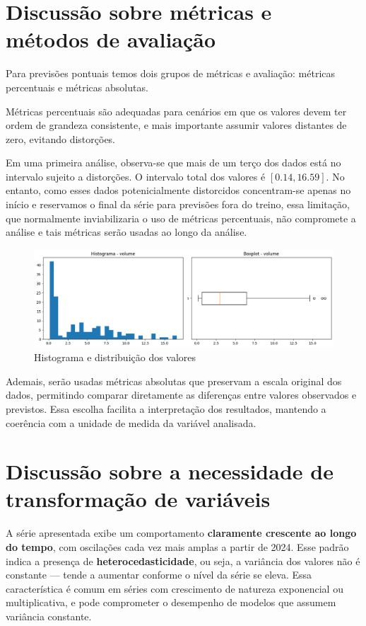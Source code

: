 \documentclass{article}
\begin{document}
\section*{Discussão sobre métricas e métodos de avaliação}

Para previsões pontuais temos dois grupos de métricas e avaliação: métricas percentuais e métricas absolutas.

Métricas percentuais são adequadas para cenários em que os valores devem ter ordem de grandeza consistente, e mais importante assumir valores distantes de zero, evitando distorções. 

Em uma primeira análise, observa-se que mais de um terço dos dados está no intervalo sujeito a distorções. O intervalo total dos valores é $[0.14, 16.59]$. No entanto, como esses dados potenicialmente distorcidos concentram-se apenas no início e reservamos o final da série para previsões fora do treino, essa limitação, que normalmente inviabilizaria o uso de métricas percentuais, não compromete a análise e tais métricas serão usadas ao longo da análise.


\begin{figure}[h]
    \centering
    \includegraphics[width=0.75\linewidth]{images/histogram.png}
    \caption{Histograma e distribuição dos valores}
\end{figure}

Ademais, serão usadas métricas absolutas que preservam a escala original dos dados, permitindo comparar diretamente as diferenças entre valores observados e previstos. Essa escolha facilita a interpretação dos resultados, mantendo a coerência com a unidade de medida da variável analisada.

\section*{Discussão sobre a necessidade de transformação de variáveis}

A série apresentada exibe um comportamento \textbf{claramente crescente ao longo do tempo}, com oscilações cada vez mais amplas a partir de 2024. Esse padrão indica a presença de \textbf{heterocedasticidade}, ou seja, a variância dos valores não é constante — tende a aumentar conforme o nível da série se eleva. Essa característica é comum em séries com crescimento de natureza exponencial ou multiplicativa, e pode comprometer o desempenho de modelos que assumem variância constante.
\end{document}
